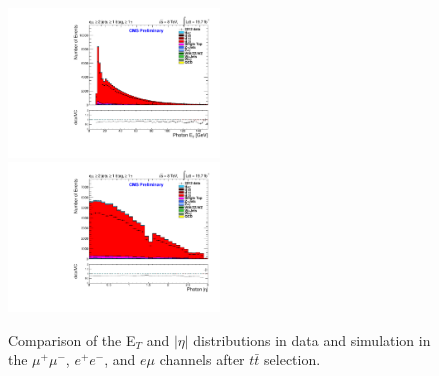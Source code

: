 \begin{figure}
\includegraphics[width=0.5\textwidth]{Plots/ControlPlots/TTbarDiLeptonAnalysis/EMu/Photons/AllPhotons/Photon_ET_splitTTbar_ratio.pdf}
\includegraphics[width=0.5\textwidth]{Plots/ControlPlots/TTbarDiLeptonAnalysis/EMu/Photons/AllPhotons/Photon_AbsEta_splitTTbar_ratio.pdf}
\caption{Comparison of the E$_{T}$ and $|\eta|$ distributions in data and simulation in the $\mu^{+}\mu^{-}$, $e^{+}e^{-}$, and $e\mu$ channels after $t\bar{t}$ selection.}
\label{fig-ttbarETandEta}
\end{figure}

